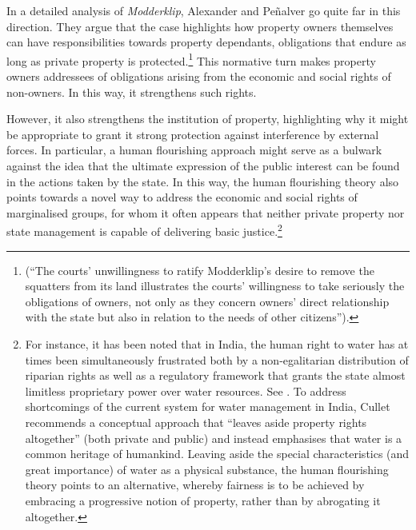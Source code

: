 In a detailed analysis of {\it Modderklip}, Alexander and Pe\~{n}alver go quite far in this direction. They argue that the case highlights how property owners themselves can have responsibilities towards property dependants, obligations that endure as long as private property is protected.\footnote{\cite[157]{alexander11} (``The courts' unwillingness to ratify Modderklip's desire to remove the squatters from its land illustrates the courts' willingness to take seriously the obligations of owners, not only as they concern owners' direct relationship with the state but also in relation to the needs of other citizens'').} This normative turn makes property owners addressees of obligations arising from the economic and social rights of non-owners. In this way, it strengthens such rights. 

However, it also strengthens the institution of property, highlighting why it might be appropriate to grant it strong protection against interference by external forces. In particular, a human flourishing approach might serve as a bulwark against the idea that the ultimate expression of the public interest can be found in the actions taken by the state. In this way, the human flourishing theory also points towards a novel way to address the economic and social rights of marginalised groups, for whom it often appears that neither private property nor state management is capable of delivering basic justice.\footnote{For instance, it has been noted that in India, the human right to water has at times been simultaneously frustrated both by a non-egalitarian distribution of riparian rights as well as a regulatory framework that grants the state almost limitless proprietary power over water resources. See \cite[186]{cullett12}.
To address shortcomings of the current system for water management in India, Cullet recommends a conceptual approach that ``leaves aside property rights altogether'' (both private and public) and instead emphasises that water is a common heritage of humankind. Leaving aside the special characteristics (and great importance) of water as a physical substance, the human flourishing theory points to an alternative, whereby fairness is to be achieved by embracing a progressive notion of property, rather than by abrogating it altogether.}
